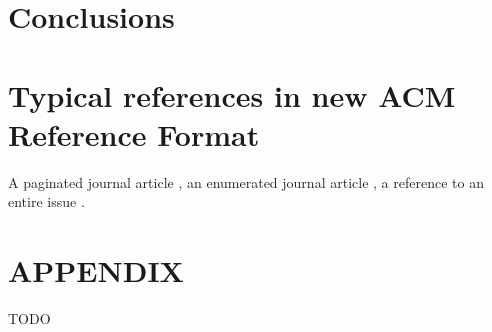 \documentclass[prodmode,acmtecs]{acmsmall} %
\begin{document}
\section{Conclusions}



\section{Typical references in new ACM Reference Format}
A paginated journal article \cite{Abril07}, an enumerated
journal article \cite{Cohen07}, a reference to an entire issue \cite{JCohen96}.

\appendix
\section*{APPENDIX}
\setcounter{section}{1}
TODO





\medskip
\end{document}
